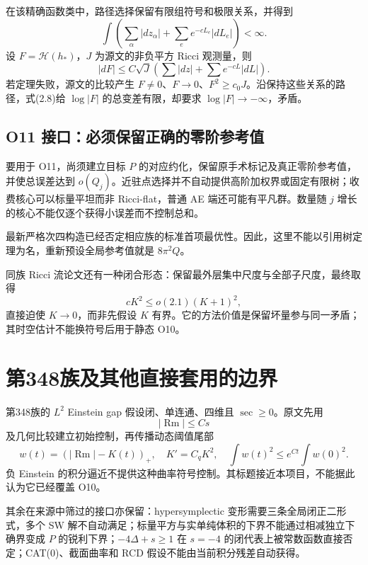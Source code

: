 \documentclass[UTF8,11pt,fontset=none]{ctexart}
\theoremstyle{definition}
\theoremstyle{remark}
\begin{document}
在该精确函数类中，路径选择保留有限组符号和极限关系，并得到 \[
 \int\left(\sum_\alpha|dz_\alpha|+
 \sum_e e^{-cL_e}|dL_e|\right)<\infty.
\tag{2.7}
\] 设 \(F=\mathscr H(h_*)\)，\(J\) 为源文的非负平方 Ricci 观测量，则 \[
 |dF|\le C\sqrt J\left(\sum|dz|+\sum e^{-cL}|dL|\right).
\tag{2.8}
\] 若定理失败，源文的比较产生 \(F\ne0\)、\(F\to0\)、\(F^2\ge c_0J\)。沿保持这些关系的路径，式(2.8)给 \(\log|F|\) 的总变差有限，却要求 \(\log|F|\to-\infty\)，矛盾。

\subsection{O11 接口：必须保留正确的零阶参考值}\label{v2-o11-ux63a5ux53e3ux5fc5ux987bux4fddux7559ux6b63ux786eux7684ux96f6ux9636ux53c2ux8003ux503c}

要用于 O11，尚须建立目标 \(P\) 的对应约化，保留原手术标记及真正零阶参考值，并使总误差达到 \(o(Q_j)\)。近驻点选择并不自动提供高阶加权界或固定有限树；收费核心可以标量平坦而非 Ricci-flat，普通 AE 端还可能有平凡群。数量随 \(j\) 增长的核心不能仅逐个获得小误差而不控制总和。

最新严格次四构造已经否定相应族的标准首项最优性。因此，这里不能以引用树定理为名，重新预设全局参考值就是 \(8\pi^2Q\)。

同族 Ricci 流论文还有一种闭合形态：保留最外层集中尺度与全部子尺度，最终取得 \[
 cK^2\le o(2.1)(K+1)^2,
\] 直接迫使 \(K\to0\)，而非先假设 \(K\) 有界。它的方法价值是保留坏量参与同一矛盾；其时空估计不能换符号后用于静态 O10。\cite{R01,R02}

\section{第348族及其他直接套用的边界}\label{v2-ux7b2c348ux65cfux53caux5176ux4ed6ux76f4ux63a5ux5957ux7528ux7684ux8fb9ux754c}

第348族的 \(L^2\) Einstein gap 假设闭、单连通、四维且 \(\sec\ge0\)。原文先用 \[
 |\operatorname{Rm}|\le Cs
\] 及几何比较建立初始控制，再传播动态阈值尾部 \[
 w(t)=(|\operatorname{Rm}|-K(t))_+,
 \quad K'=C_qK^2,
 \quad\int w(t)^2\le e^{Ct}\int w(0)^2.
\] 负 Einstein 的积分逼近不提供这种曲率符号控制。其标题接近本项目，不能据此认为它已经覆盖 O10。\cite{OAI348,R01}

其余在来源中筛过的接口亦保留：hypersymplectic 变形需要三条全局闭正二形式，多个 SW 解不自动满足；标量平方与实单纯体积的下界不能通过相减独立下确界变成 \(P\) 的锐利下界；\(-4\Delta+s\ge1\) 在 \(s=-4\) 的闭代表上被常数函数直接否定；CAT(0)、截面曲率和 RCD 假设不能由当前积分残差自动获得。
\end{document}
